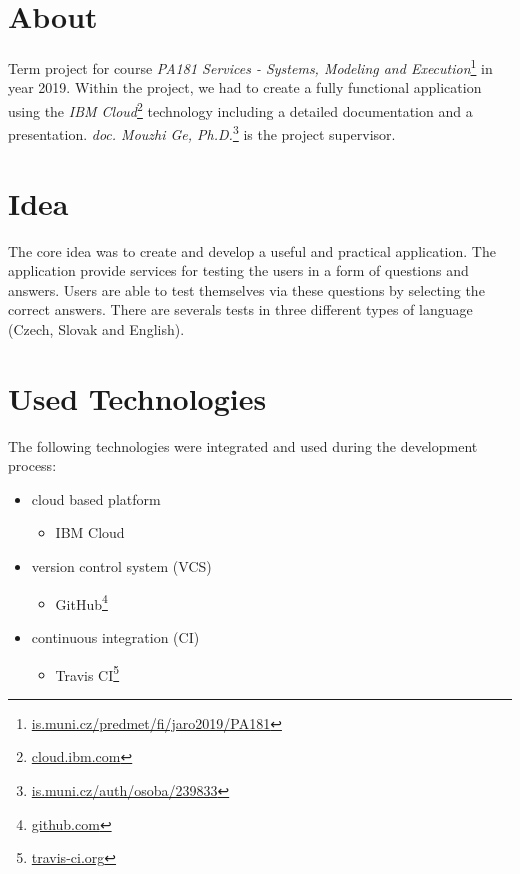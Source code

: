 \documentclass[11pt,a4paper]{article}
\begin{document}
\setlength{\parskip}{0pt}
    \hypersetup{hidelinks}\tableofcontents
\setlength{\parskip}{0pt}

\newpage

\section{About}

Term project for course \textit{PA181 Services - Systems, Modeling and Execution}\footnote{\href{https://is.muni.cz/predmet/fi/jaro2019/PA181}{is.muni.cz/predmet/fi/jaro2019/PA181}} in year 2019. Within the project, we had to create a fully functional application using the \textit{IBM Cloud}\footnote{\href{https://cloud.ibm.com/}{cloud.ibm.com}} technology including a detailed documentation and a presentation. \textit{doc. Mouzhi Ge, Ph.D.}\footnote{\href{https://is.muni.cz/auth/osoba/239833}{is.muni.cz/auth/osoba/239833}} is the project supervisor.

\section{Idea}

The core idea was to create and develop a useful and practical application. The application provide services for testing the users in a form of questions and answers. Users are able to test themselves via these questions by selecting the correct answers. There are severals tests in three different types of language (Czech, Slovak and English).

\section{Used Technologies}

The following technologies were integrated and used during the development process:
\begin{itemize}
    \item cloud based platform
    \begin{itemize}
        \item IBM Cloud
    \end{itemize}

    \item version control system (VCS)
    \begin{itemize}
        \item GitHub\footnote{\href{https://github.com/}{github.com}}
    \end{itemize}

    \item continuous integration (CI)
    \begin{itemize}
        \item Travis CI\footnote{\href{https://travis-ci.org/}{travis-ci.org}}
    \end{itemize}
\end{itemize}
\end{document}
